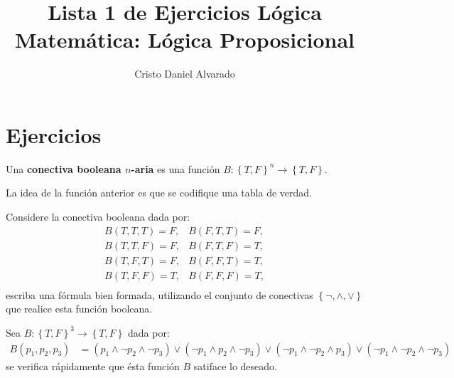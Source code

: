 \documentclass[12pt]{report}
\newcounter{it}
\theoremstyle{largebreak}
\newcommand\cf[3]{\ensuremath{#1:#2\rightarrow#3}}
\begin{document}
    \setlength{\parskip}{5pt} %
    \setlength{\parindent}{12pt} %
    \title{Lista 1 de Ejercicios Lógica Matemática: Lógica Proposicional}
    \author{Cristo Daniel Alvarado}
    \maketitle

    \setcounter{chapter}{1}

    \section{Ejercicios}

    \begin{mydef}
        Una \textbf{conectiva booleana $n$-aria} es una función $\cf{B}{\left\{T,F \right\}^n}{\left\{T,F \right\}}$.
    \end{mydef}

    \begin{obs}
        La idea de la función anterior es que se codifique una tabla de verdad.
    \end{obs}

    \begin{excer}
        Considere la conectiva booleana dada por:
        \begin{equation*}
            \begin{array}{lr}
                B(T,T,T)=F, & B(F,T,T)=F,\\
                B(T,T,F)=F, & B(F,T,F)=T,\\
                B(T,F,T)=F, & B(F,F,T)=T,\\
                B(T,F,F)=T, & B(F,F,F)=T,\\
            \end{array}
        \end{equation*}
        escriba una fórmula bien formada, utilizando el conjunto de conectivas $\left\{\neg,\land,\lor \right\}$ que realice esta función booleana.
    \end{excer}

    \begin{sol}
        Sea $\cf{B}{\left\{T,F \right\}^3}{\left\{T,F \right\}}$ dada por:
        \begin{equation*}
            \begin{split}
                B(p_1,p_2,p_3)&=(p_1\land\neg p_2\land\neg p_3)\lor(\neg p_1\land p_2\land\neg p_3)\lor(\neg p_1\land\neg p_2\land p_3)\lor(\neg p_1\land\neg p_2\land\neg p_3)
            \end{split}
        \end{equation*}
        se verifica rápidamente que ésta función $B$ satiface lo deseado.
    \end{sol}
\end{document}
